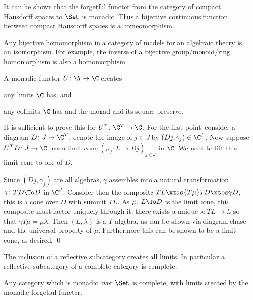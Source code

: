 \bexam

    It can be shown that the forgetful functor from the category of compact Hausdorff spaces to $\Set$ is monadic.
    Thus a bijective continuous function between compact Hausdorff spaces is a homeomorphism.

\eexam

\bexam

    Any bijective homomorphism in a category of models for an algebraic theory is an isomorphism.
    For example, the inverse of a bijective group/monoid/ring homomorphism is also a homomorphism.

\eexam

\bthrm

    A monadic functor $U\colon\A\to\C$ creates
    \benum
        \item any limits $\C$ has, and
        \item any colimits $\C$ has and the monad and its square preserve.
    \eenum

\ethrm

\bproof

    It is sufficient to prove this for $U^T\colon\C^T\to\C$.
    For the first point, consider a diagram $D\colon J\to\C^T$; denote the image of $j\in J$ by $(Dj,\gamma_j)\in\C^T$.
    Now suppose $U^TD\colon J\to\C$ has a limit cone $(\mu_j\colon L\to Dj)_{j\in J}$ in $\C$.
    We need to lift this limit cone to one of $D$.

    Since $(Dj,\gamma_j)$ are all algebras, $\gamma$ assembles into a natural transformation $\gamma\colon TD\To D$ in $\C^J$.
    Consider then the composite $TL\xtos{T\mu}TD\xtos\gamma D$, this is a cone over $D$ with summit $TL$.
    As $\mu\colon L\To D$ is the limit cone, this composite must factor uniquely through it: there exists a unique $\lambda\colon TL\to L$ so that $\gamma T\mu=\mu\lambda$.
    Then $(L,\lambda)$ is a $T$-algebra, as can be shown via diagram chase and the universal property of $\mu$.
    Furthermore this can be shown to be a limit cone, as desired.
    \qed

\eproof

\bcoro

    The inclusion of a reflective subcategory creates all limits.
    In particular a reflective subcategory of a complete category is complete.

\ecoro

\bcoro

    Any category which is monadic over $\Set$ is complete, with limits created by the monadic forgetful functor.

